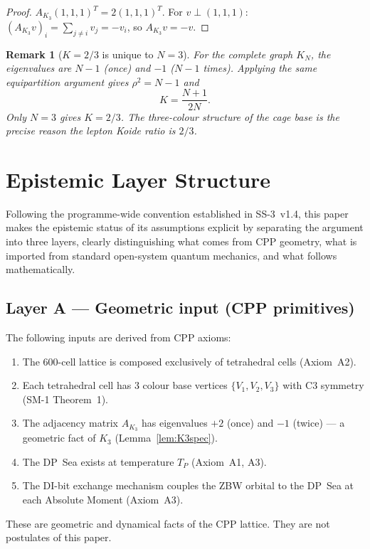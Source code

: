 \documentclass[11pt]{article}
\newtheorem{remark}{Remark}[section]
\begin{document}
\begin{proof}
$A_{K_3}(1,1,1)^T = 2(1,1,1)^T$.  For $v\perp(1,1,1)$:
$(A_{K_3}v)_i = \sum_{j\neq i}v_j = -v_i$, so $A_{K_3}v = -v$.
\end{proof}

\begin{remark}[$K = 2/3$ is unique to $N=3$]
For the complete graph $K_N$, the eigenvalues are $N-1$ (once) and $-1$
($N-1$ times).  Applying the same equipartition argument gives
$\rho^2 = N-1$ and
\[
K = \frac{N+1}{2N}.
\]
Only $N=3$ gives $K=2/3$.  The three-colour structure of the cage base
is the precise reason the lepton Koide ratio is $2/3$.
\end{remark}

\section{Epistemic Layer Structure}
\label{sec:layers}

Following the programme-wide convention established in SS-3~v1.4,
this paper makes the epistemic status of its assumptions explicit
by separating the argument into three layers, clearly distinguishing
what comes from CPP geometry, what is imported from standard
open-system quantum mechanics, and what follows mathematically.

\subsection{Layer A --- Geometric input (CPP primitives)}

The following inputs are derived from CPP axioms:
\begin{enumerate}[label=(A\arabic*)]
\item The 600-cell lattice is composed exclusively of tetrahedral
  cells (Axiom~A2).
\item Each tetrahedral cell has $3$ colour base vertices
  $\{V_1,V_2,V_3\}$ with C3 symmetry (SM-1 Theorem~1).
\item The adjacency matrix $A_{K_3}$ has eigenvalues $+2$ (once)
  and $-1$ (twice) --- a geometric fact of $K_3$
  (Lemma~\ref{lem:K3spec}).
\item The DP~Sea exists at temperature $T_P$ (Axiom~A1, A3).
\item The DI-bit exchange mechanism couples the ZBW orbital
  to the DP~Sea at each Absolute Moment (Axiom~A3).
\end{enumerate}
These are geometric and dynamical facts of the CPP lattice.
They are not postulates of this paper.
\end{document}
